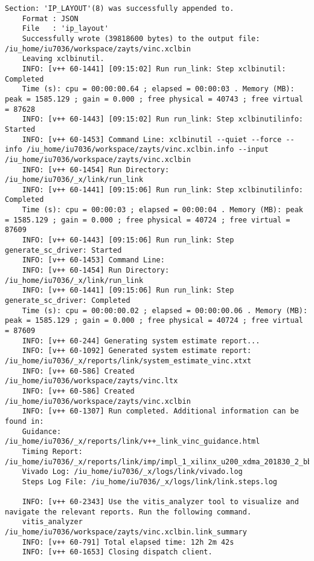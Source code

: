 \begin{lstlisting}[caption=Содержимое файла v++\_vinc.log для измененного проекта, label={log2}]
	Section: 'IP_LAYOUT'(8) was successfully appended to.
	Format : JSON
	File   : 'ip_layout'
	Successfully wrote (39818600 bytes) to the output file: /iu_home/iu7036/workspace/zayts/vinc.xclbin
	Leaving xclbinutil.
	INFO: [v++ 60-1441] [09:15:02] Run run_link: Step xclbinutil: Completed
	Time (s): cpu = 00:00:00.64 ; elapsed = 00:00:03 . Memory (MB): peak = 1585.129 ; gain = 0.000 ; free physical = 40743 ; free virtual = 87628
	INFO: [v++ 60-1443] [09:15:02] Run run_link: Step xclbinutilinfo: Started
	INFO: [v++ 60-1453] Command Line: xclbinutil --quiet --force --info /iu_home/iu7036/workspace/zayts/vinc.xclbin.info --input /iu_home/iu7036/workspace/zayts/vinc.xclbin
	INFO: [v++ 60-1454] Run Directory: /iu_home/iu7036/_x/link/run_link
	INFO: [v++ 60-1441] [09:15:06] Run run_link: Step xclbinutilinfo: Completed
	Time (s): cpu = 00:00:03 ; elapsed = 00:00:04 . Memory (MB): peak = 1585.129 ; gain = 0.000 ; free physical = 40724 ; free virtual = 87609
	INFO: [v++ 60-1443] [09:15:06] Run run_link: Step generate_sc_driver: Started
	INFO: [v++ 60-1453] Command Line: 
	INFO: [v++ 60-1454] Run Directory: /iu_home/iu7036/_x/link/run_link
	INFO: [v++ 60-1441] [09:15:06] Run run_link: Step generate_sc_driver: Completed
	Time (s): cpu = 00:00:00.02 ; elapsed = 00:00:00.06 . Memory (MB): peak = 1585.129 ; gain = 0.000 ; free physical = 40724 ; free virtual = 87609
	INFO: [v++ 60-244] Generating system estimate report...
	INFO: [v++ 60-1092] Generated system estimate report: /iu_home/iu7036/_x/reports/link/system_estimate_vinc.xtxt
	INFO: [v++ 60-586] Created /iu_home/iu7036/workspace/zayts/vinc.ltx
	INFO: [v++ 60-586] Created /iu_home/iu7036/workspace/zayts/vinc.xclbin
	INFO: [v++ 60-1307] Run completed. Additional information can be found in:
	Guidance: /iu_home/iu7036/_x/reports/link/v++_link_vinc_guidance.html
	Timing Report: /iu_home/iu7036/_x/reports/link/imp/impl_1_xilinx_u200_xdma_201830_2_bb_locked_timing_summary_routed.rpt
	Vivado Log: /iu_home/iu7036/_x/logs/link/vivado.log
	Steps Log File: /iu_home/iu7036/_x/logs/link/link.steps.log
	
	INFO: [v++ 60-2343] Use the vitis_analyzer tool to visualize and navigate the relevant reports. Run the following command. 
	vitis_analyzer /iu_home/iu7036/workspace/zayts/vinc.xclbin.link_summary 
	INFO: [v++ 60-791] Total elapsed time: 12h 2m 42s
	INFO: [v++ 60-1653] Closing dispatch client.
	
\end{lstlisting} 